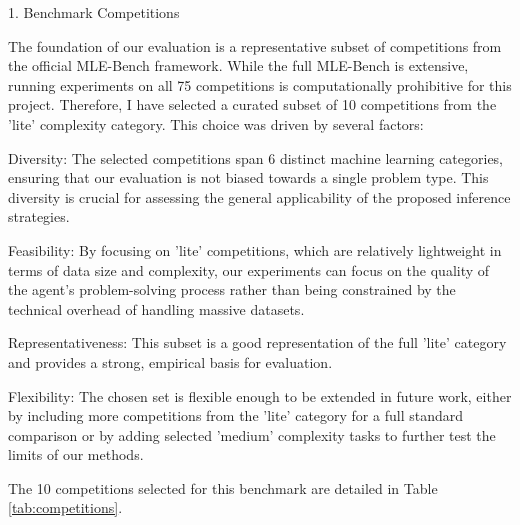 1. Benchmark Competitions

The foundation of our evaluation is a representative subset of competitions from the official MLE-Bench framework. While the full MLE-Bench is extensive, running experiments on all 75 competitions is computationally prohibitive for this project. Therefore, I have selected a curated subset of 10 competitions from the 'lite' complexity category. This choice was driven by several factors:

Diversity: The selected competitions span 6 distinct machine learning categories, ensuring that our evaluation is not biased towards a single problem type. This diversity is crucial for assessing the general applicability of the proposed inference strategies.

Feasibility: By focusing on 'lite' competitions, which are relatively lightweight in terms of data size and complexity, our experiments can focus on the quality of the agent's problem-solving process rather than being constrained by the technical overhead of handling massive datasets.

Representativeness: This subset is a good representation of the full 'lite' category and provides a strong, empirical basis for evaluation.

Flexibility: The chosen set is flexible enough to be extended in future work, either by including more competitions from the 'lite' category for a full standard comparison or by adding selected 'medium' complexity tasks to further test the limits of our methods.

The 10 competitions selected for this benchmark are detailed in Table \ref{tab:competitions}.


